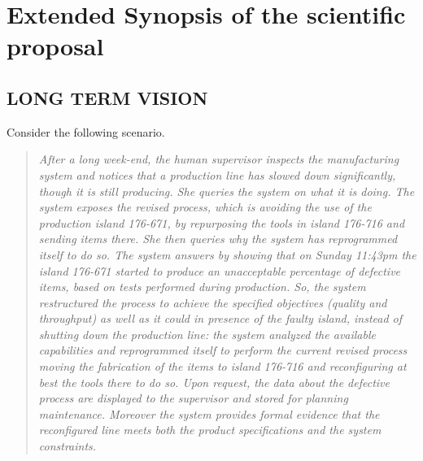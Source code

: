 \section{Extended Synopsis of the scientific proposal}





\vspace{-1ex}


\subsection*{LONG TERM VISION} %

%
\vspace{-1ex}

Consider the following scenario.
\begin{quote}\it
  After a long week-end, the human supervisor inspects the
  manufacturing system and notices that a production line has
   slowed down significantly, though it is still producing.
  She queries the system on what it is doing.  The system exposes the
  revised process, which is avoiding the use of the production island
  176-671, by repurposing the tools in island 176-716 and sending
  items there.
  She then queries why the system has reprogrammed itself to do so.
  The system answers by showing that on Sunday 11:43pm the island
  176-671 started to produce an unacceptable percentage of defective
  items, based on tests performed during production. 
  So, the system restructured the process to achieve the specified
  objectives (quality and throughput) as well as it could in presence
  of the faulty island, instead of shutting down the production line:
the system analyzed the available capabilities and 
reprogrammed itself to perform
  the current revised process moving the fabrication of the items to
  island 176-716 and reconfiguring at best the tools there to do so.
  Upon request, the %
  data about the defective process are displayed to the
  supervisor and stored for planning maintenance. Moreover the system
  provides formal evidence that the reconfigured line meets both the
  product specifications and the system constraints.


\end{quote}

